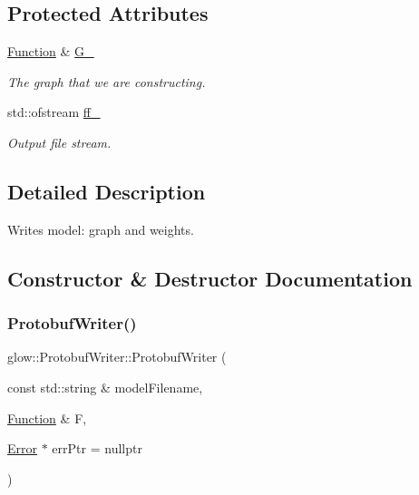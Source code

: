 \subsection*{Protected Attributes}
\begin{DoxyCompactItemize}
\item 
\mbox{\label{classglow_1_1_protobuf_writer_a6bdd4b02f8ff5f5b4ea7c23b7d923909}} 
\hyperlink{classglow_1_1_function}{Function} \& \hyperlink{classglow_1_1_protobuf_writer_a6bdd4b02f8ff5f5b4ea7c23b7d923909}{G\+\_\+}
\begin{DoxyCompactList}\small\item\em The graph that we are constructing. \end{DoxyCompactList}\item 
\mbox{\label{classglow_1_1_protobuf_writer_aa979402a6c014fcacdc87c3fa8715a50}} 
std\+::ofstream \hyperlink{classglow_1_1_protobuf_writer_aa979402a6c014fcacdc87c3fa8715a50}{ff\+\_\+}
\begin{DoxyCompactList}\small\item\em Output file stream. \end{DoxyCompactList}\end{DoxyCompactItemize}


\subsection{Detailed Description}
Writes model\+: graph and weights. 

\subsection{Constructor \& Destructor Documentation}
\mbox{\label{classglow_1_1_protobuf_writer_a4c960b5cc47d4d309c109d2cf9043fd9}} 
\subsubsection{\texorpdfstring{Protobuf\+Writer()}{ProtobufWriter()}}
{\footnotesize\ttfamily glow\+::\+Protobuf\+Writer\+::\+Protobuf\+Writer (\begin{DoxyParamCaption}\item[{const std\+::string \&}]{model\+Filename,  }\item[{\hyperlink{classglow_1_1_function}{Function} \&}]{F,  }\item[{\hyperlink{namespaceglow_afdb176c3a672ef66db0ecfc19a8d39bf}{Error} $\ast$}]{err\+Ptr = {\ttfamily nullptr} }\end{DoxyParamCaption})}

